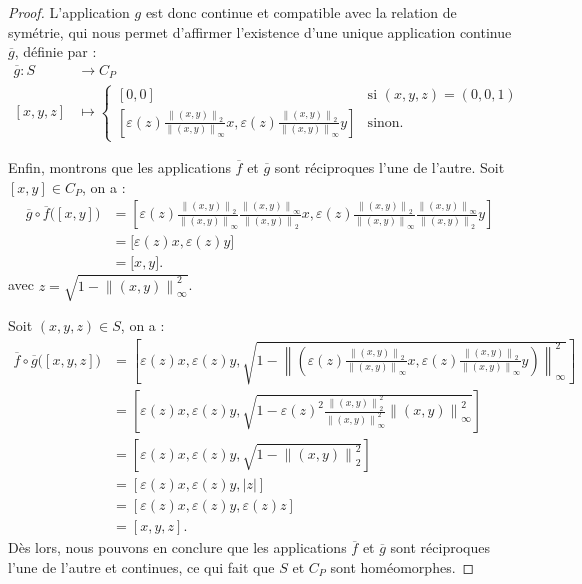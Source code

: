 \documentclass[hidelinks, 10pt]{article}
\begin{document}
\begin{proof}
\bigskip L'application $g$ est donc continue et compatible avec la relation de symétrie, qui nous permet d'affirmer l'existence d'une unique application continue $\overline{g}$, définie par : \[\begin{split}
\overline{g}:S&\longrightarrow C_P\\
[x,y,z]&\mapsto\left\{\begin{matrix}
    [0,0]&\text{si } (x,y,z)=(0,0,1)\\
\left[\varepsilon(z)\frac{\left \| (x,y) \right \|_2}{\left \| (x,y) \right \|_\infty}x,\varepsilon(z)\frac{\left \| (x,y) \right \|_2}{\left \| (x,y) \right \|_\infty}y\right]&\text{sinon.}
\end{matrix}\right.
\end{split}\]

Enfin, montrons que les applications $\overline{f}$ et $\overline{g}$ sont réciproques l'une de l'autre. Soit~$[x,y]\in C_P$, on a : \[\begin{split}
\overline{g}\circ\overline{f}\big([x,y]\big)&=\left[\varepsilon(z)\frac{\left \| (x,y) \right \|_2}{\left \| (x,y) \right \|_\infty}\frac{\left \| (x,y) \right \|_\infty}{\left \| (x,y) \right \|_2}x,\varepsilon(z)\frac{\left \| (x,y) \right \|_2}{\left \| (x,y) \right \|_\infty}\frac{\left \| (x,y) \right \|_\infty}{\left \| (x,y) \right \|_2}y\right]\\
&=\big[\varepsilon(z)x,\varepsilon(z)y]\\
&=\big[x,y\big].
\end{split}\]avec $z=\sqrt{1-\left \|(x,y)  \right \|_\infty^2}$.

Soit $(x,y,z)\in S$, on a : \[\begin{split}
\overline{f}\circ\overline{g}\big([x,y,z]\big)&=\left[\varepsilon(z)x,\varepsilon(z)y,\sqrt{1-\left \| \left( \varepsilon(z)\frac{\left \| (x,y) \right \|_2}{\left \| (x,y) \right \|_\infty}x,\varepsilon(z)\frac{\left \| (x,y) \right \|_2}{\left \| (x,y) \right \|_\infty}y\right)\right\|_\infty^2}\right]\\
&=\left[\varepsilon(z)x,\varepsilon(z)y,\sqrt{1-\varepsilon(z)^2\frac{\left \| (x,y) \right \|_2^2}{\left \| (x,y) \right \|_\infty^2}\left \|(x,y)  \right \|_\infty^2}\right]\\
&=\left[\varepsilon(z)x,\varepsilon(z)y,\sqrt{1-\left \| (x,y) \right \|_2^2}\right]\\
&=[\varepsilon(z)x,\varepsilon(z)y,|z|]\\
&=[\varepsilon(z)x,\varepsilon(z)y,\varepsilon(z)z]\\
&=[x,y,z].
\end{split}\]Dès lors, nous pouvons en conclure que les applications $\overline{f}$ et $\overline{g}$ sont réciproques l'une de l'autre et continues, ce qui fait que $S$ et $C_P$ sont homéomorphes.
\end{proof}
\end{document}
